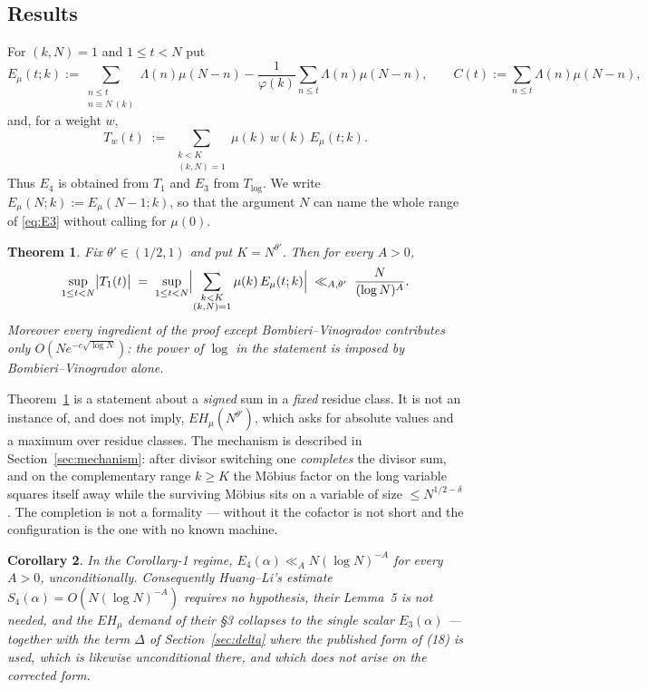 \documentclass[11pt,a4paper]{article}
\theoremstyle{plain}
\newtheorem{theorem}{Theorem}
\newtheorem{corollary}[theorem]{Corollary}
\theoremstyle{definition}
\theoremstyle{remark}
\newcommand{\Emu}{E_\mu}
\begin{document}
\subsection{Results}

For $(k,N)=1$ and $1\le t<N$ put
\begin{equation}\label{eq:Emu}
  \Emu(t;k):=\sum_{\substack{n\le t\\ n\equiv N\ (k)}}\Lambda(n)\mu(N-n)
             -\frac{1}{\varphi(k)}\sum_{n\le t}\Lambda(n)\mu(N-n),
  \qquad
  C(t):=\sum_{n\le t}\Lambda(n)\mu(N-n),
\end{equation}
and, for a weight $w$,
\[
  T_w(t)\;:=\;\sum_{\substack{k<K\\ (k,N)=1}}\mu(k)\,w(k)\,\Emu(t;k).
\]
Thus $E_4$ is obtained from $T_1$ and $E_3$ from $T_{\log}$. We write
$\Emu(N;k):=\Emu(N-1;k)$, so that the argument $N$ can name the whole
range of \eqref{eq:E3} without calling for $\mu(0)$.

\begin{theorem}\label{thm:A}
Fix $\theta'\in(1/2,1)$ and put $K=N^{\theta'}$. Then for every $A>0$,
\[
  \sup_{1\le t<N}\bigl|T_1(t)\bigr|
  \;=\;\sup_{1\le t<N}
  \Bigl|\sum_{\substack{k<K\\(k,N)=1}}\mu(k)\,\Emu(t;k)\Bigr|
  \;\ll_{A,\theta'}\;\frac{N}{(\log N)^{A}}.
\]
Moreover every ingredient of the proof except Bombieri--Vinogradov
contributes only $O\!\left(Ne^{-c\sqrt{\log N}}\right)$: the power of
$\log$ in the statement is imposed by Bombieri--Vinogradov alone.
\end{theorem}

Theorem~\ref{thm:A} is a statement about a \emph{signed} sum in a
\emph{fixed} residue class. It is not an instance of, and does not
imply, $EH_\mu(N^{\theta'})$, which asks for absolute values and a
maximum over residue classes. The mechanism is described in
Section~\ref{sec:mechanism}: after divisor switching one
\emph{completes} the divisor sum, and on the complementary range
$k\ge K$ the M\"obius factor on the long variable squares itself away
while the surviving M\"obius sits on a variable of size
$\le N^{1/2-\delta}$. The completion is not a formality --- without it
the cofactor is not short and the configuration is the one with no
known machine.

\begin{corollary}\label{cor:B}
In the Corollary-1 regime, $E_4(\alpha)\ll_A N(\log N)^{-A}$ for every
$A>0$, unconditionally. Consequently Huang--Li's estimate
$S_4(\alpha)=O(N(\log N)^{-A})$ requires no hypothesis, their Lemma~5
is not needed, and the $EH_\mu$ demand of their \S3 collapses to the
single scalar $E_3(\alpha)$ --- together with the
term $\Delta$ of Section~\ref{sec:delta} where the published form of
(18) is used, which is likewise unconditional there, and which does not
arise on the corrected form.
\end{corollary}
\end{document}
